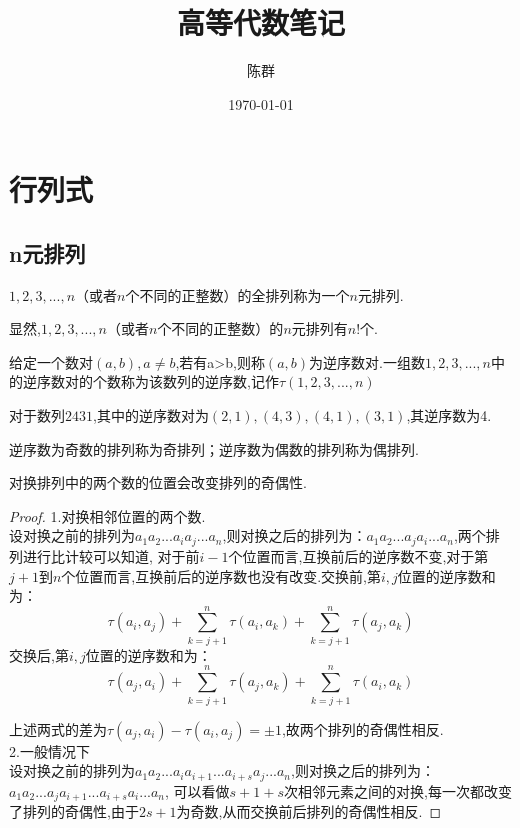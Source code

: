 \documentclass[blue,normal,cn]{elegantnote}
\title{高等代数笔记}
\author{陈群}
\date{\today}
\begin{document}
\tableofcontents
{\color{ecolor}{\maketitle}}


\section{行列式}
\subsection{n元排列}

\begin{definition}[$n$元排列]
$1,2,3,...,n$（或者$n$个不同的正整数）的全排列称为一个$n$元排列.
\end{definition}
显然,$1,2,3,...,n$（或者$n$个不同的正整数）的$n$元排列有$n!$个.

\begin{definition}[逆序数对和逆序数]
给定一个数对$(a,b),a ≠b $,若有a>b,则称$(a,b)$为逆序数对.一组数$1,2,3,...,n$中的逆序数对的个数称为该数列的逆序数,记作$τ(1,2,3,...,n)$
\end{definition}
对于数列$2431$,其中的逆序数对为$(2,1),(4,3),(4,1),(3,1)$,其逆序数为4.

\begin{definition}[奇排列与偶排列]
逆序数为奇数的排列称为奇排列；逆序数为偶数的排列称为偶排列.
\end{definition}

\begin{theorem}
对换排列中的两个数的位置会改变排列的奇偶性.
\end{theorem}

\begin{proof}
1.对换相邻位置的两个数.\\
设对换之前的排列为$a_1a_2...a_ia_j...a_n$,则对换之后的排列为：$a_1a_2...a_ja_i...a_n$,两个排列进行比计较可以知道,
对于前$i-1$个位置而言,互换前后的逆序数不变,对于第$j+1$到$n$个位置而言,互换前后的逆序数也没有改变.交换前,第$i,j$位置的逆序数和为：
$$
τ(a_i,a_j)+\sum_{k=j+1}^{n}\tau (a_i,a_k)+\sum_{k=j+1}^{n} \tau (a_j,a_k)
$$
交换后,第$i,j$位置的逆序数和为：
$$
τ(a_j,a_i)+\sum_{k=j+1}^{n}\tau (a_j,a_k)+\sum_{k=j+1}^{n} \tau (a_i,a_k)
$$

上述两式的差为$τ(a_j,a_i)-τ(a_i,a_j)=±1$,故两个排列的奇偶性相反.
\\
2.一般情况下\\
设对换之前的排列为$a_1a_2...a_ia_{i+1}...a_{i+s}a_j...a_n$,则对换之后的排列为：$a_1a_2...a_ja_{i+1}...a_{i+s}a_i...a_n$,
可以看做$s+1+s$次相邻元素之间的对换,每一次都改变了排列的奇偶性,由于$2s+1$为奇数,从而交换前后排列的奇偶性相反.
\end{proof}
\end{document}
